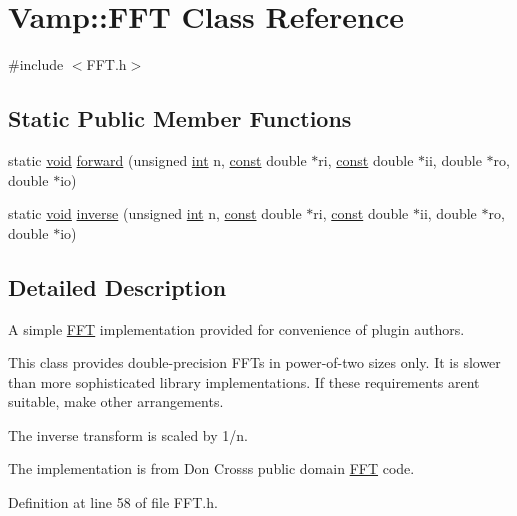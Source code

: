 \hypertarget{class_vamp_1_1_f_f_t}{}\section{Vamp\+:\+:F\+FT Class Reference}
\label{class_vamp_1_1_f_f_t}


{\ttfamily \#include $<$F\+F\+T.\+h$>$}

\subsection*{Static Public Member Functions}
\begin{DoxyCompactItemize}
\item 
static \hyperlink{sound_8c_ae35f5844602719cf66324f4de2a658b3}{void} \hyperlink{class_vamp_1_1_f_f_t_a55b989403218220e13340aa2acf8c1c1}{forward} (unsigned \hyperlink{xmltok_8h_a5a0d4a5641ce434f1d23533f2b2e6653}{int} n, \hyperlink{getopt1_8c_a2c212835823e3c54a8ab6d95c652660e}{const} double $\ast$ri, \hyperlink{getopt1_8c_a2c212835823e3c54a8ab6d95c652660e}{const} double $\ast$ii, double $\ast$ro, double $\ast$io)
\item 
static \hyperlink{sound_8c_ae35f5844602719cf66324f4de2a658b3}{void} \hyperlink{class_vamp_1_1_f_f_t_ade68f62ab5738fd0651fc9082ce13c4e}{inverse} (unsigned \hyperlink{xmltok_8h_a5a0d4a5641ce434f1d23533f2b2e6653}{int} n, \hyperlink{getopt1_8c_a2c212835823e3c54a8ab6d95c652660e}{const} double $\ast$ri, \hyperlink{getopt1_8c_a2c212835823e3c54a8ab6d95c652660e}{const} double $\ast$ii, double $\ast$ro, double $\ast$io)
\end{DoxyCompactItemize}


\subsection{Detailed Description}
A simple \hyperlink{class_vamp_1_1_f_f_t}{F\+FT} implementation provided for convenience of plugin authors.

This class provides double-\/precision F\+F\+Ts in power-\/of-\/two sizes only. It is slower than more sophisticated library implementations. If these requirements aren\textquotesingle{}t suitable, make other arrangements.

The inverse transform is scaled by 1/n.

The implementation is from Don Cross\textquotesingle{}s public domain \hyperlink{class_vamp_1_1_f_f_t}{F\+FT} code. 

Definition at line 58 of file F\+F\+T.\+h.



